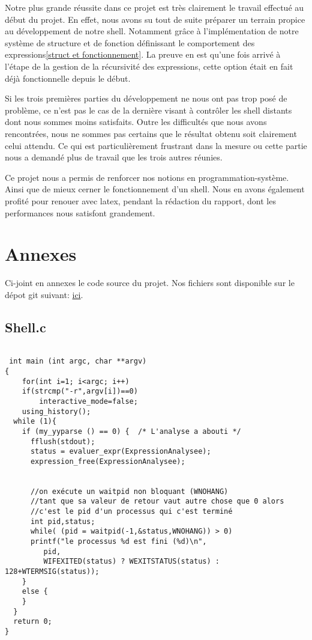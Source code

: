 \documentclass[12pt]{article}
\begin{document}
Notre plus grande réussite dans ce projet est très clairement le travail effectué au
début du projet. En effet, nous avons su tout de suite préparer un terrain propice au
développement de notre shell. Notamment grâce à l'implémentation de notre système de structure et 
de fonction définissant le comportement des expressions\ref{struct et fonctionnement}.
La preuve en est qu'une fois arrivé à l'étape de la gestion de la récursivité des expressions, 
cette option était en fait déjà fonctionnelle depuis le début.\newline

Si les trois premières parties du développement ne nous ont pas trop posé de problème, ce n'est
pas le cas de la dernière visant à contrôler les shell distants dont nous sommes moins satisfaits.
Outre les difficultés que nous avons rencontrées, nous ne sommes pas certains que le résultat obtenu
soit clairement celui attendu. Ce qui est particulièrement frustrant dans la mesure ou cette partie
nous a demandé plus de travail que les trois autres réunies.\newline

Ce projet nous a permis de renforcer nos notions en programmation-système. Ainsi que de mieux
cerner le fonctionnement d'un shell. Nous en avons également profité pour renouer avec latex,
pendant la rédaction du rapport, dont les performances nous satisfont grandement.


\newpage
\section{Annexes}

Ci-joint en annexes le code source du projet. Nos fichiers sont disponible sur le dépot git suivant:
 \href{https://github.com/beziarum/shell.git}{ici}.

 \scriptsize
\subsection{Shell.c}
\label{main}
\begin{verbatim}

 int main (int argc, char **argv)
{
    for(int i=1; i<argc; i++)
	if(strcmp("-r",argv[i])==0)
	    interactive_mode=false;
    using_history();
  while (1){
    if (my_yyparse () == 0) {  /* L'analyse a abouti */
      fflush(stdout);
      status = evaluer_expr(ExpressionAnalysee);
      expression_free(ExpressionAnalysee);


      //on exécute un waitpid non bloquant (WNOHANG)
      //tant que sa valeur de retour vaut autre chose que 0 alors
      //c'est le pid d'un processus qui c'est terminé
      int pid,status;
      while( (pid = waitpid(-1,&status,WNOHANG)) > 0)
	  printf("le processus %d est fini (%d)\n",
		 pid,
		 WIFEXITED(status) ? WEXITSTATUS(status) : 128+WTERMSIG(status));
    }
    else {
    }
  }
  return 0;
}
\end{verbatim}
\end{document}
